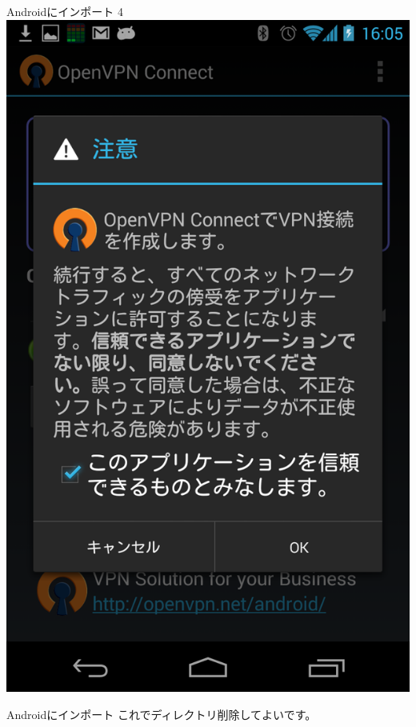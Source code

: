 \begin{frame}{Androidにインポート 4}
\includegraphics[height=0.9\vsize,bb=0 0 768
 1280]{image201308/Screenshot_2013-08-17-16-05-07.png}
\end{frame}

\begin{frame}{Androidにインポート}
これでディレクトリ削除してよいです。
\end{frame}


